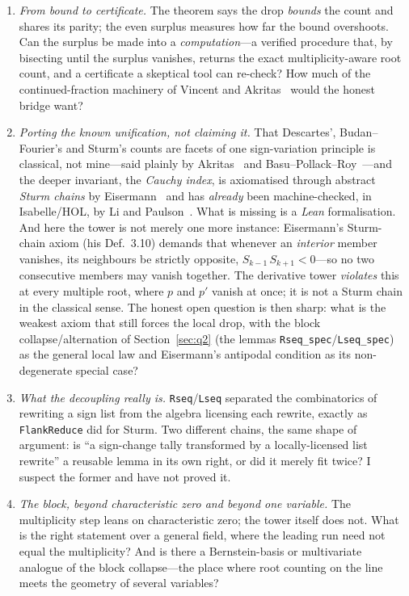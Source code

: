\documentclass[11pt]{article}
\newcommand{\lean}[1]{\texttt{#1}}
\begin{document}
\begin{enumerate}\itemsep3pt
\item \emph{From bound to certificate.} The theorem says the drop \emph{bounds} the count and shares
its parity; the even surplus measures how far the bound overshoots. Can the surplus be made into a
\emph{computation}---a verified procedure that, by bisecting until the surplus vanishes, returns the
exact multiplicity-aware root count, and a certificate a skeptical tool can re-check? How much of the
continued-fraction machinery of Vincent and Akritas~\cite{vincent,collinsakritas} would the honest
bridge want?

\item \emph{Porting the known unification, not claiming it.} That Descartes', Budan--Fourier's and
Sturm's counts are facets of one sign-variation principle is classical, not mine---said plainly by
Akritas~\cite{akritas} and Basu--Pollack--Roy~\cite{bpr}---and the deeper invariant, the \emph{Cauchy
index}, is axiomatised through abstract \emph{Sturm chains} by Eisermann~\cite{eisermann} and has
\emph{already} been machine-checked, in Isabelle/HOL, by Li and Paulson~\cite{liCauchy}. What is missing
is a \emph{Lean} formalisation. And here the tower is not merely one more instance: Eisermann's
Sturm-chain axiom (his Def.~3.10) demands that whenever an \emph{interior} member vanishes, its
neighbours be strictly opposite, $S_{k-1}\,S_{k+1}<0$---so no two consecutive members may vanish
together. The derivative tower \emph{violates} this at every multiple root, where $p$ and $p'$ vanish
at once; it is not a Sturm chain in the classical sense. The honest open question is then sharp: what is
the weakest axiom that still forces the local drop, with the block collapse/alternation of
Section~\ref{sec:q2} (the lemmas \lean{Rseq\_spec}/\lean{Lseq\_spec}) as the general local law and
Eisermann's antipodal condition as its non-degenerate special case?

\item \emph{What the decoupling really is.} \lean{Rseq}/\lean{Lseq} separated the combinatorics of
rewriting a sign list from the algebra licensing each rewrite, exactly as \lean{FlankReduce} did for
Sturm. Two different chains, the same shape of argument: is ``a sign-change tally transformed by a
locally-licensed list rewrite'' a reusable lemma in its own right, or did it merely fit twice? I
suspect the former and have not proved it.

\item \emph{The block, beyond characteristic zero and beyond one variable.} The multiplicity step
leans on characteristic zero; the tower itself does not. What is the right statement over a general
field, where the leading run need not equal the multiplicity? And is there a Bernstein-basis or
multivariate analogue of the block collapse---the place where root counting on the line meets the
geometry of several variables?
\end{enumerate}
\end{document}
